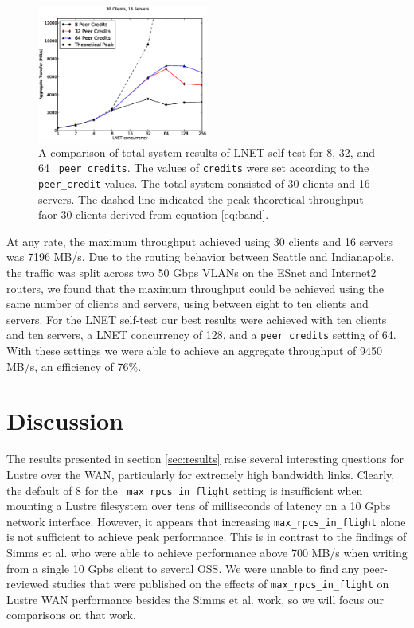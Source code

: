 \documentclass[]{sigplan-proc}
\begin{document}
\begin{figure}
\centering
\includegraphics[width=0.50\textwidth]{figures/all_pc_theory_plot.eps}
\caption{A comparison of total system results of LNET self-test for 8, 32, and 64 {\tt
    peer\_credits}. The values of {\tt credits} were set according to the {\tt peer\_credit} values. The total
system consisted of 30 clients and 16 servers. The dashed line indicated the peak theoretical throughput faor
30 clients derived from equation \ref{eq:band}.}
\label{fig:allserver}
\end{figure}

At any rate, the maximum throughput achieved using 30 clients and 16 servers was 7196 MB/s. Due to the routing
behavior between Seattle and Indianapolis, the traffic was split across two 50 Gbps VLANs on the ESnet and
Internet2 routers, we found that the maximum throughput could be achieved using the same number of clients and
servers, using between eight to ten clients and servers. For the LNET self-test our best results were achieved
with ten clients and ten servers, a LNET concurrency of 128, and a {\tt peer\_credits} setting of 64. With
these settings we were able to achieve an aggregate throughput of 9450 MB/s, an efficiency of 76\%.

\section{Discussion}\label{sec:discussion} 

The results presented in section \ref{sec:results} raise several interesting questions for Lustre over the
WAN, particularly for extremely high bandwidth links. Clearly, the default of 8 for the {\tt
  max\_rpcs\_in\_flight} setting is insufficient when mounting a Lustre filesystem over tens of milliseconds
of latency on a 10 Gpbs network interface. However, it appears that increasing {\tt max\_rpcs\_in\_flight}
alone is not sufficient to achieve peak performance. This is in contrast to the findings of Simms et
al. \cite{simms2007} who were able to achieve performance above 700 MB/s when writing from a single 10 Gpbs
client to several OSS. We were unable to find any peer-reviewed studies that were published on the effects of
{\tt max\_rpcs\_in\_flight} on Lustre WAN performance besides the Simms et al. work, so we will focus our
comparisons on that work.
\end{document}
